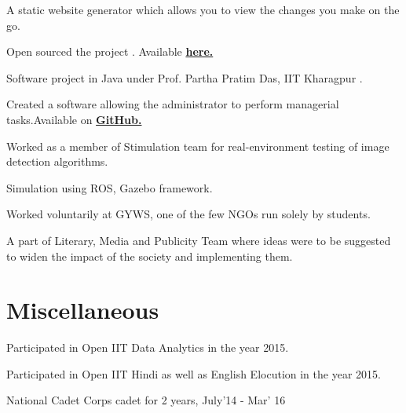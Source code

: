 \documentclass[a4paper]{deedy-resume} %
\begin{document}
\begin{minipage}[t]{0.66\textwidth}
  \sectionspace
  
  \runsubsection{}
  \begin{tightitemize}
  \item A static website generator which allows you to view the changes you make on the go.
  \item Open sourced the project . Available \href{https://github.com/kaustubhhiware/Code.Play}{\bf here.}
  \end{tightitemize}

  \sectionspace
  
  \runsubsection{}
  \begin{tightitemize}
  \item Software project in Java under Prof. Partha Pratim Das, IIT Kharagpur .
  \item Created a software allowing the administrator to perform managerial tasks.Available on \href{https://github.com/kaustubhhiware/DepInfosys}{\bf GitHub.}
  \end{tightitemize}

  \sectionspace

  \runsubsection{}
  \begin{tightitemize}
  \item	Worked as a member of Stimulation team for real-environment testing of image detection algorithms.
  \item Simulation using ROS, Gazebo framework.
 \end{tightitemize}


  \sectionspace

  \runsubsection{}
  \begin{tightitemize}
  \item Worked voluntarily at GYWS, one of the few NGOs run solely by students.
  \item A part of Literary, Media and Publicity Team where ideas were to be suggested to widen the impact of the society and implementing them.
  \end{tightitemize}

  \section{Miscellaneous}
  \vspace{\topsep}
  \begin{tightitemize}
  \item Participated in Open IIT Data Analytics in the year 2015.
  \item Participated in Open IIT Hindi as well as English Elocution in the year 2015.
  \item National Cadet Corps cadet for 2 years, July'14 - Mar' 16
  \end{tightitemize}
\end{minipage}
\end{document}
